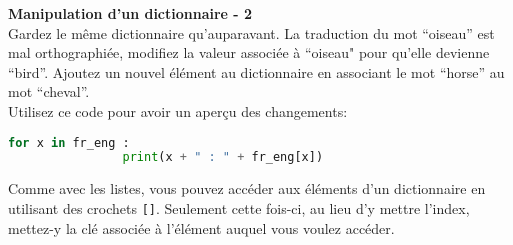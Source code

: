     \begin{Exercice}[5 minutes] \textbf{Manipulation d'un dictionnaire - 2}\\
       Gardez le même dictionnaire qu'auparavant. La traduction du mot ``oiseau'' est mal orthographiée, modifiez la valeur associée à ``oiseau" pour qu'elle devienne ``bird''. Ajoutez un nouvel élément au dictionnaire en associant le mot ``horse'' au mot ``cheval''. \\
       
       Utilisez ce code pour avoir un aperçu des changements:
       
       \begin{lstlisting}[language=Python]
            for x in fr_eng :
    			print(x + " : " + fr_eng[x])   \end{lstlisting}
    
        \begin{conseil}
            Comme avec les listes, vous pouvez accéder aux éléments d'un dictionnaire en utilisant des crochets \lstinline{[]}. Seulement cette fois-ci, au lieu d'y mettre l'index, mettez-y la clé associée à l'élément auquel vous voulez accéder.
        \end{conseil}
        
        \begin{solution}
             
        \end{solution}
    \end{Exercice}
    
